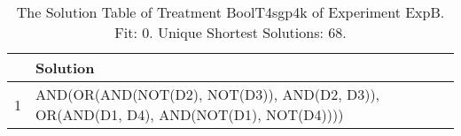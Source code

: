 \begin{table}[ht]
\centering
\begin{tabular}{rp{9cm}}
  \hline
 & Solution \\ 
  \hline
1 & AND(OR(AND(NOT(D2), NOT(D3)), AND(D2, D3)), OR(AND(D1, D4), AND(NOT(D1), NOT(D4)))) \\ 
   \hline
\end{tabular}
\caption{The Solution Table of Treatment BoolT4sgp4k of Experiment ExpB. Fit: 0. Unique Shortest Solutions: 68.} 
\end{table}
